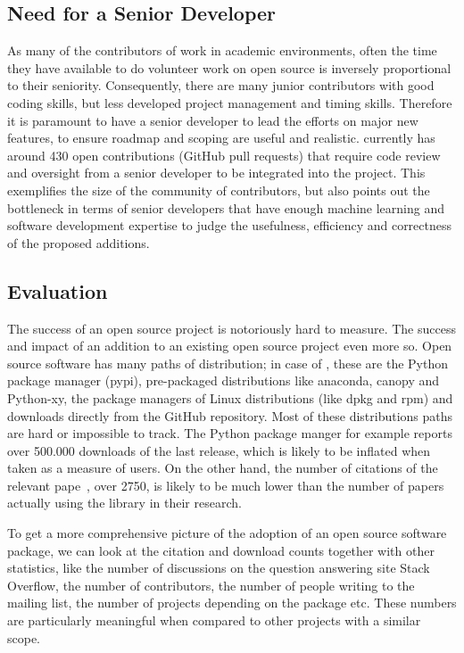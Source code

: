 \subsection{Need for a Senior Developer}
As many of the contributors of \sklearn{} work in academic environments,
often the time they have available to do volunteer work on open source is
inversely proportional to their seniority.
Consequently, there are many junior contributors with good coding skills,
but less developed project management and timing skills.
Therefore it is paramount to have a senior developer to lead the efforts
on major new features, to ensure roadmap and scoping are useful and realistic.
\sklearn{} currently has around 430 open contributions (GitHub pull requests)
that require code review and oversight from a senior developer to be integrated
into the project. This exemplifies the size of the community of contributors,
but also points out the bottleneck in terms of senior developers that
have enough machine learning and software development expertise to judge
the usefulness, efficiency and correctness of the proposed additions.


\subsection{Evaluation}
The success of an open source project is notoriously hard to measure. The
success and impact of an addition to an existing open source project even more
so. Open source software has many paths of distribution; in case of \sklearn{},
these are the Python package manager (pypi), pre-packaged distributions like
anaconda, canopy and Python-xy, the package managers of Linux distributions (like dpkg and rpm)
and downloads directly from the GitHub repository. Most of these distributions paths are hard
or impossible to track. The Python package manger for example reports over 500.000 downloads of the last
release, which is likely to be inflated when taken as a measure of users.
On the other hand, the number of citations of the relevant
pape~\autocite{pedregosa2011scikit}, over 2750, is likely to be much lower than
the number of papers actually using the \sklearn{} library in their research.

To get a more comprehensive picture of the adoption of an open source software
package, we can look at the citation and download counts together with other
statistics, like the number of discussions on the question answering site
Stack Overflow, the number of contributors, the number of people writing to the
mailing list, the number of projects depending on the package etc.  These
numbers are particularly meaningful when compared to other projects with a
similar scope.

